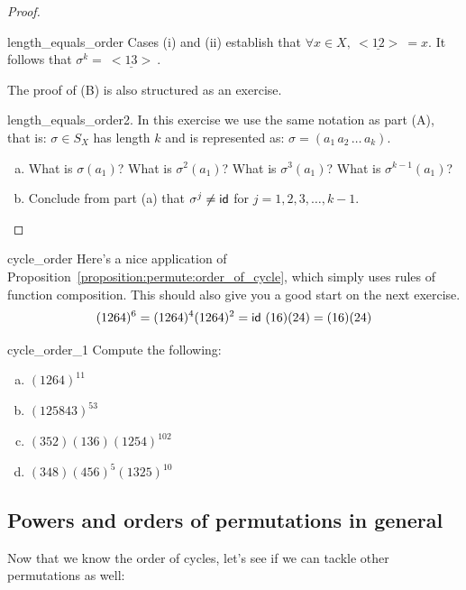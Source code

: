 \begin{proof}
\begin{exercise}{length_equals_order}
\noindent
Cases (i) and (ii) establish that  $\forall x \in X, \underline{~<12>~} = x$.  It follows that $\sigma^k = \underline{~<13>~}$.

\end{exercise}

\noindent
The proof of (B) is also structured as an exercise.

\begin{exercise}{length_equals_order2}. In this exercise we use the same notation as part (A), that is: $\sigma \in S_X$ has length $k$ and is represented as: $\sigma = (a_1 \, a_2 \, \ldots \, a_k)$. 
\begin{enumerate}[(a)]
\item
What is $\sigma(a_1)$? What is $\sigma^2(a_1)$? What is $\sigma^3(a_1)$? What is $\sigma^{k-1}(a_1)$?
\item
Conclude from part (a) that  $\sigma^j \neq {\sf{i}d} $ for $j = 1,2,3, \ldots, k-1.$
\end{enumerate}
\end{exercise}
\end{proof}

\begin{example}{cycle_order}
Here's a nice application of Proposition~\ref{proposition:permute:order_of_cycle}, which simply uses rules of function composition.  This should also give you a good start on the next exercise.
\[
(1 2 6 4)^6 = (1 2 6 4)^4 (1 2 6 4)^2 = {\sf{i}d} ~(1 6) (2 4) = (1 6)(2 4) \]
\end{example}

\begin{exercise}{cycle_order_1}
Compute the following:
\begin{multicols}{2}
\begin{enumerate}[(a)]
\item
$(1 2 6 4)^{11}$
\item
$(1 2 5 8 4 3)^{53}$
\item
$(3 5 2)(1 3 6)(1254)^{102}$
\item
$(3 4 8) (4 5 6)^5 (1 3 2 5)^{10}$
\end{enumerate}
\end{multicols}
\end{exercise}

\subsection{Powers and orders of permutations in general}

Now that we know the order of cycles, let's see if we can tackle other permutations as well:

